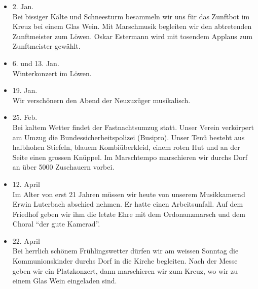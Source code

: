 \begin{history}


    \begin{itemize}

        \item[]2. Jan.\\
        Bei bissiger Kälte und Schneesturm besammeln wir uns für das Zunftbot im
        Kreuz bei einem Glas Wein. Mit Marschmusik begleiten wir den abtretenden
        Zunftmeister zum Löwen. Oskar Estermann wird mit tosendem Applaus zum
        Zunftmeister gewählt.

        \item[]6. und 13. Jan.\\
        Winterkonzert im Löwen.

        \item[]19. Jan.\\
        Wir verschönern den Abend der Neuzuzüger musikalisch.

        \item[]25. Feb.\\
        Bei kaltem Wetter findet der Fastnachtsumzug statt. Unser Verein
        verkörpert am Umzug die Bundessicherheitspolizei (Busipro). Unser Tenü
        besteht aus halbhohen Stiefeln, blauem Kombiüberkleid, einem roten Hut
        und an der Seite einen grossen Knüppel. Im Marschtempo marschieren wir
        durchs Dorf an über 5000 Zuschauern vorbei.

        \item[]12. April\\
        Im Alter von erst 21 Jahren müssen wir heute von unserem Musikkamerad
        Erwin Luterbach abschied nehmen. Er hatte einen Arbeitsunfall. Auf dem
        Friedhof geben wir ihm die letzte Ehre mit dem Ordonanzmarsch und dem
        Choral \enquote{der gute Kamerad}.

        \item[]22. April\\
        Bei herrlich schönem Frühlingswetter dürfen wir am weissen Sonntag die
        Kommunionskinder durchs Dorf in die Kirche begleiten. Nach der Messe
        geben wir ein Platzkonzert, dann marschieren wir zum Kreuz, wo wir zu
        einem Glas Wein eingeladen sind.


\end{itemize}
\end{history}
